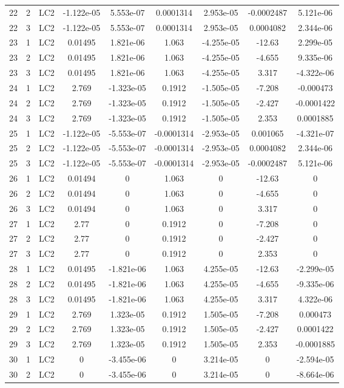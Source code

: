 \documentclass{article}%
\begin{document}
\begin{longtable}{| c c c | c c c c c c |}
22&2&LC2&{-}1.122e{-}05&5.553e{-}07&0.0001314&2.953e{-}05&{-}0.0002487&5.121e{-}06\\%
22&3&LC2&{-}1.122e{-}05&5.553e{-}07&0.0001314&2.953e{-}05&0.0004082&2.344e{-}06\\%
23&1&LC2&0.01495&1.821e{-}06&1.063&{-}4.255e{-}05&{-}12.63&2.299e{-}05\\%
23&2&LC2&0.01495&1.821e{-}06&1.063&{-}4.255e{-}05&{-}4.655&9.335e{-}06\\%
23&3&LC2&0.01495&1.821e{-}06&1.063&{-}4.255e{-}05&3.317&{-}4.322e{-}06\\%
24&1&LC2&2.769&{-}1.323e{-}05&0.1912&{-}1.505e{-}05&{-}7.208&{-}0.000473\\%
24&2&LC2&2.769&{-}1.323e{-}05&0.1912&{-}1.505e{-}05&{-}2.427&{-}0.0001422\\%
24&3&LC2&2.769&{-}1.323e{-}05&0.1912&{-}1.505e{-}05&2.353&0.0001885\\%
25&1&LC2&{-}1.122e{-}05&{-}5.553e{-}07&{-}0.0001314&{-}2.953e{-}05&0.001065&{-}4.321e{-}07\\%
25&2&LC2&{-}1.122e{-}05&{-}5.553e{-}07&{-}0.0001314&{-}2.953e{-}05&0.0004082&2.344e{-}06\\%
25&3&LC2&{-}1.122e{-}05&{-}5.553e{-}07&{-}0.0001314&{-}2.953e{-}05&{-}0.0002487&5.121e{-}06\\%
26&1&LC2&0.01494&0&1.063&0&{-}12.63&0\\%
26&2&LC2&0.01494&0&1.063&0&{-}4.655&0\\%
26&3&LC2&0.01494&0&1.063&0&3.317&0\\%
27&1&LC2&2.77&0&0.1912&0&{-}7.208&0\\%
27&2&LC2&2.77&0&0.1912&0&{-}2.427&0\\%
27&3&LC2&2.77&0&0.1912&0&2.353&0\\%
28&1&LC2&0.01495&{-}1.821e{-}06&1.063&4.255e{-}05&{-}12.63&{-}2.299e{-}05\\%
28&2&LC2&0.01495&{-}1.821e{-}06&1.063&4.255e{-}05&{-}4.655&{-}9.335e{-}06\\%
28&3&LC2&0.01495&{-}1.821e{-}06&1.063&4.255e{-}05&3.317&4.322e{-}06\\%
29&1&LC2&2.769&1.323e{-}05&0.1912&1.505e{-}05&{-}7.208&0.000473\\%
29&2&LC2&2.769&1.323e{-}05&0.1912&1.505e{-}05&{-}2.427&0.0001422\\%
29&3&LC2&2.769&1.323e{-}05&0.1912&1.505e{-}05&2.353&{-}0.0001885\\%
30&1&LC2&0&{-}3.455e{-}06&0&3.214e{-}05&0&{-}2.594e{-}05\\%
30&2&LC2&0&{-}3.455e{-}06&0&3.214e{-}05&0&{-}8.664e{-}06\\%

\end{longtable}
\end{document}
